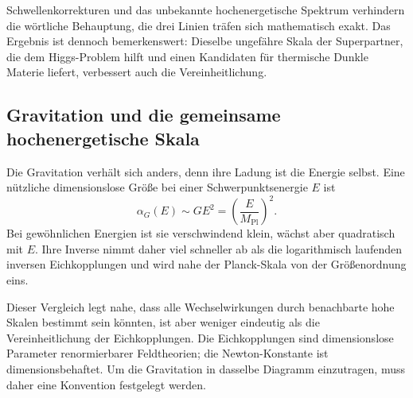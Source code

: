 Schwellenkorrekturen und das unbekannte hochenergetische Spektrum verhindern die wörtliche Behauptung, die drei Linien träfen sich mathematisch exakt. Das Ergebnis ist dennoch bemerkenswert: Dieselbe ungefähre Skala der Superpartner, die dem Higgs-Problem hilft und einen Kandidaten für thermische Dunkle Materie liefert, verbessert auch die Vereinheitlichung.

\subsection{Gravitation und die gemeinsame hochenergetische Skala}

Die Gravitation verhält sich anders, denn ihre Ladung ist die Energie selbst. Eine nützliche dimensionslose Größe bei einer Schwerpunktsenergie \(E\) ist
\begin{equation}
\alpha_G(E)\sim GE^2
=\left(\frac{E}{M_{\mathrm{Pl}}}\right)^2.
\end{equation}
Bei gewöhnlichen Energien ist sie verschwindend klein, wächst aber quadratisch mit \(E\). Ihre Inverse nimmt daher viel schneller ab als die logarithmisch laufenden inversen Eichkopplungen und wird nahe der Planck-Skala von der Größenordnung eins.

Dieser Vergleich legt nahe, dass alle Wechselwirkungen durch benachbarte hohe Skalen bestimmt sein könnten, ist aber weniger eindeutig als die Vereinheitlichung der Eichkopplungen. Die Eichkopplungen sind dimensionslose Parameter renormierbarer Feldtheorien; die Newton-Konstante ist dimensionsbehaftet. Um die Gravitation in dasselbe Diagramm einzutragen, muss daher eine Konvention festgelegt werden.

\begin{classroomqa}
\end{classroomqa}

\begin{classroomqa}
\end{classroomqa}


